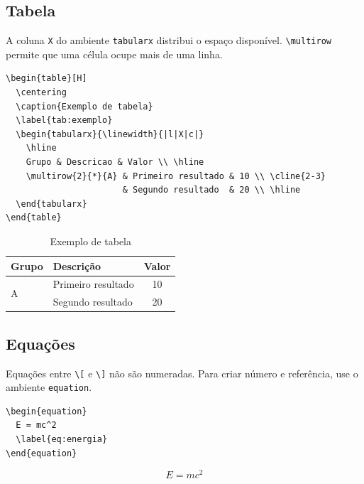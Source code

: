 \subsection{Tabela}

A coluna \texttt{X} do ambiente \texttt{tabularx} distribui o espaço disponível.
\verb|\multirow| permite que uma célula ocupe mais de uma linha.

\begin{lstlisting}[language={[LaTeX]TeX},caption={Tabela com largura ajustável}]
\begin{table}[H]
  \centering
  \caption{Exemplo de tabela}
  \label{tab:exemplo}
  \begin{tabularx}{\linewidth}{|l|X|c|}
    \hline
    Grupo & Descricao & Valor \\ \hline
    \multirow{2}{*}{A} & Primeiro resultado & 10 \\ \cline{2-3}
                       & Segundo resultado  & 20 \\ \hline
  \end{tabularx}
\end{table}
\end{lstlisting}

\begin{table}[H]
  \centering
  \caption{Exemplo de tabela}
  \label{tab:exemplo}
  \begin{tabularx}{\linewidth}{|l|X|c|}
    \hline
    Grupo & Descrição & Valor \\ \hline
    \multirow{2}{*}{A} & Primeiro resultado & 10 \\ \cline{2-3}
                       & Segundo resultado  & 20 \\ \hline
  \end{tabularx}
\end{table}

\subsection{Equações}

Equações entre \verb|\[| e \verb|\]| não são numeradas. Para criar número e
referência, use o ambiente \texttt{equation}.

\begin{lstlisting}[language={[LaTeX]TeX},caption={Equação numerada}]
\begin{equation}
  E = mc^2
  \label{eq:energia}
\end{equation}
\end{lstlisting}

\begin{equation}
  E = mc^2
  \label{eq:energia}
\end{equation}
